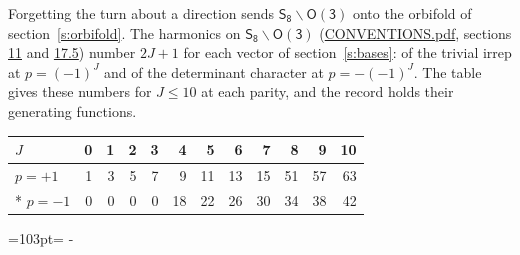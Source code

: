 \documentclass[10pt,a4paper]{article}
\newcommand{\needspace}[1]{\par\penalty-100\begingroup\dimen0=#1\relax\dimen2=\pagegoal
  \advance\dimen2-\pagetotal\ifdim\dimen0>\dimen2\relax\ifdim\dimen2>0pt\vfil\break\fi\fi
  \endgroup}
\numberwithin{equation}{section}
\newcommand{\grp}[1]{\mathsf{#1}}
\begin{document}
Forgetting the turn about a direction sends $\grp{S_{8}}\backslash\grp{O(3)}$ onto the orbifold of section~\ref{s:orbifold}.
The harmonics on $\grp{S_{8}}\backslash\grp{O(3)}$ (\href{../../CONVENTIONS.pdf}{CONVENTIONS.pdf}, sections \href{../../CONVENTIONS.pdf\#conv.11}{11} and \href{../../CONVENTIONS.pdf\#conv.17.5}{17.5}) number $2J + 1$ for each vector of section~\ref{s:bases}: of the trivial irrep at $p = (-1)^J$ and of the determinant character at $p = -(-1)^J$. The table gives these numbers for $J \le 10$ at each parity, and the record holds their generating functions.
{\small\setlength{\tabcolsep}{4pt}\begin{longtable}{@{}lrrrrrrrrrrr@{}}\toprule
$J$ & 0 & 1 & 2 & 3 & 4 & 5 & 6 & 7 & 8 & 9 & 10\\\midrule\endhead
\bottomrule\endfoot\endlastfoot
$p = +1$ & 1 & 3 & 5 & 7 & 9 & 11 & 13 & 15 & 51 & 57 & 63\\*
$p = -1$ & 0 & 0 & 0 & 0 & 18 & 22 & 26 & 30 & 34 & 38 & 42\\
\bottomrule\end{longtable}}
\needspace{103pt}
\end{document}
